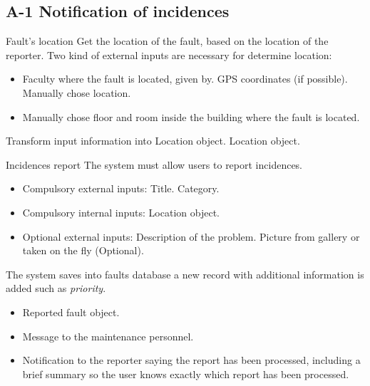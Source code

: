 
\subsection{A-1 Notification of incidences}

\begin{requirement}{Fault's location}
\reqdesc Get the location of the fault, based on the location of the reporter.
\reqin Two kind of external inputs are necessary for determine location:
\begin{itemize}
\item Faculty where the fault is located, given by.
\subitem GPS coordinates (if possible).
\subitem Manually chose location.
\item Manually chose floor and room inside the building where the fault is located.
\end{itemize}
\reqsteps Transform input information into Location object.
\reqout Location object.
\end{requirement}

\begin{requirement}{Incidences report}
\reqdesc The system must allow users to report incidences.
\reqin 
\begin{itemize}
	\item Compulsory external inputs:
	\subitem Title.
	\subitem Category.
	\item Compulsory internal inputs:
	\subitem Location object.
	\item Optional external inputs:
	\subitem Description of the problem.
	\subitem Picture from gallery or taken on the fly (Optional).
\end{itemize}
\reqsteps The system saves into faults database a new record with additional information is added such as \textit{priority}.
\reqout
\begin{itemize}
	\item Reported fault object.
	\item Message to the maintenance personnel.
	\item Notification to the reporter saying the report has been processed, including a brief summary so the user knows exactly which report has been processed.
\end{itemize}
\end{requirement}


